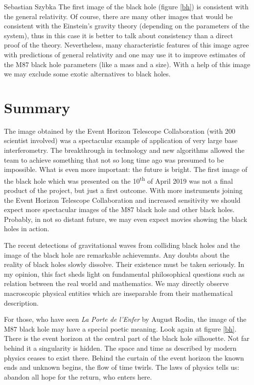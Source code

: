 \begin{artengenv}{Sebastian Szybka}
The first image of the black hole (figure \ref{bh}) is consistent with the general relativity. Of course, there are many other images that would be consistent with the Einstein's gravity theory (depending on the parameters of the system), thus in this case it is better to talk about consistency than a direct proof of the theory. Nevertheless, many characteristic features of this image agree with predictions of general relativity and one may use it to improve estimates of the M87 black hole parameters (like a mass and a size). With a help of this image we may exclude some exotic alternatives to black holes. 

\section{Summary}

The image obtained by the Event Horizon Telescope Collaboration (with 200 scientist involved) was a spectacular example of application of very large base interferometry. The breakthrough in technology and new algorithms allowed the team to achieve something that not so long time ago was presumed to be impossible. What is even more important: the future is bright. The first image of the black hole which was presented on the 10\textsuperscript{th} of April 2019 was not a final product of the project, but just a first outcome. With more instruments joining the Event Horizon Telescope Collaboration and increased sensitivity we should expect more spectacular images of the M87 black hole and other black holes. Probably, in not so distant future, we may even expect  movies showing the black holes in action. 

The recent detections of gravitational waves from colliding black holes and the image of the black hole are remarkable achievemnts. Any doubts about the reality of black holes slowly dissolve. Their existence must be taken seriously. In my opinion, this fact sheds light on fundamental philosophical questions such as relation between the real world and mathematics. We may directly observe macroscopic physical entities which are inseparable from their mathematical description. 

For those, who have seen \textit{La Porte de l'Enfer} by August Rodin, the image of the M87 black hole may have a special poetic meaning. Look again at figure \ref{bh}. There is the event horizon at the central part of the black hole silhouette. Not far behind it a singularity is hidden. The space and time as described by modern physics ceases to exist there. Behind the curtain of the event horizon the known ends and unknown begins, the flow of time twirls. The laws of physics tells us: abandon all hope for the return, who enters here.

\end{artengenv}